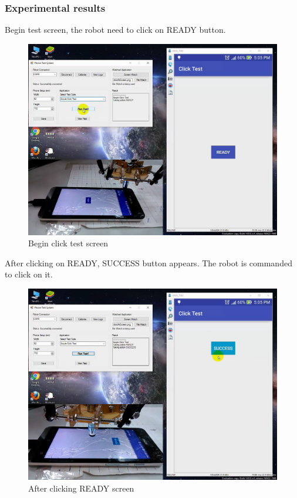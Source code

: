 \subsubsection{Experimental results}
Begin test screen, the robot need to click on READY button.
	\begin{figure}[H]
		\centering
		\includegraphics[scale=0.5]{Chapters/Fig/click_start.png}
		\caption{Begin click test screen}
		\label{fig:click_start}
	\end{figure}

After clicking on READY, SUCCESS button appears. The robot is commanded to click on it.

	\begin{figure}[H]
		\centering
		\includegraphics[scale=0.5]{Chapters/Fig/click_mid.png}
		\caption{After clicking READY screen}
		\label{fig:click_mid}
	\end{figure}

